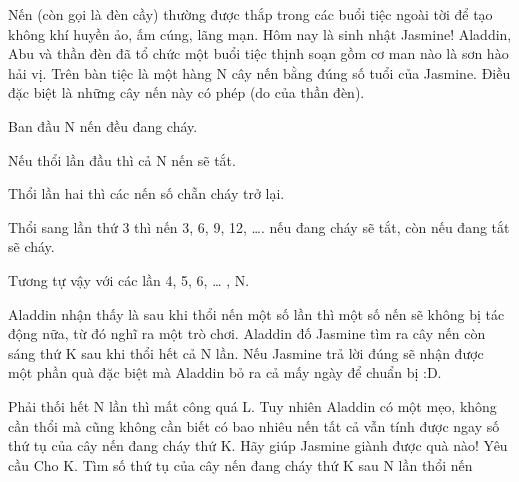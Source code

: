 Nến (còn gọi là đèn cầy) thường được thắp trong các buổi tiệc ngoài tời để tạo không khí huyền ảo, ấm cúng, lãng mạn. Hôm nay là sinh nhật Jasmine! Aladdin, Abu và thần đèn đã tổ chức một buổi tiệc thịnh soạn gồm cơ man nào là sơn hào hải vị. Trên bàn tiệc là một hàng N cây nến bằng đúng số tuổi của Jasmine. Điều đặc biệt là những cây nến này có phép (do của thần đèn).

Ban đầu N nến đều đang cháy.

Nếu thổi lần đầu thì cả N nến sẽ tắt.

Thổi lần hai thì các nến số chẵn cháy trở lại.

Thổi sang lần thứ 3 thì nến 3, 6, 9, 12, …. nếu đang cháy sẽ tắt, còn nếu đang tắt sẽ cháy.

Tương tự vậy với các lần 4, 5, 6, … , N.

Aladdin nhận thấy là sau khi thổi nến một số lần thì một số nến sẽ không bị tác động nữa, từ đó nghĩ ra một trò chơi. Aladdin đố Jasmine tìm ra cây nến còn sáng thứ K sau khi thổi hết cả N lần. Nếu Jasmine trả lời đúng sẽ nhận được một phần quà đặc biệt mà Aladdin bỏ ra cả mấy ngày để chuẩn bị :D.

Phải thối hết N lần thì mất công quá L. Tuy nhiên Aladdin có một mẹo, không cần thổi mà cũng không cần biết có bao nhiêu nến tất cả vẫn tính được ngay số thứ tụ của cây nến đang cháy thứ K. Hãy giúp Jasmine giành được quà nào!
Yêu cầu
Cho K. Tìm số thứ tụ của cây nến đang cháy thứ K sau N lần thổi nến